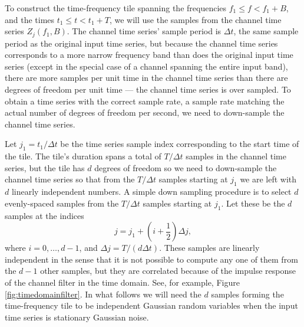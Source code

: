 \documentclass[10pt]{article}
\begin{document}
To construct the time-frequency tile spanning the frequencies \(f_{1} \leq
f < f_{1} + B\), and the times \(t_{1} \leq t < t_{1} + T\), we will use
the samples from the channel time series \(Z_{j}(f_{1}, B)\).  The channel
time series' sample period is \(\Delta t\), the same sample period as the
original input time series, but because the channel time series corresponds
to a more narrow frequency band than does the original input time series
(except in the special case of a channel spanning the entire input band),
there are more samples per unit time in the channel time series than there
are degrees of freedom per unit time --- the channel time series is over
sampled.  To obtain a time series with the correct sample rate, a sample
rate matching the actual number of degrees of freedom per second, we need
to down-sample the channel time series.

Let \(j_{1} = t_{1} / \Delta t\) be the time series sample index
corresponding to the start time of the tile.  The tile's duration spans a
total of \(T / \Delta t\) samples in the channel time series, but the tile
has \(d\) degrees of freedom so we need to down-sample the channel time
series so that from the \(T / \Delta t\) samples starting at \(j_{1}\) we
are left with \(d\) linearly independent numbers.  A simple down sampling
procedure is to select \(d\) evenly-spaced samples from the \(T / \Delta
t\) samples starting at \(j_{1}\).  Let these be the \(d\) samples at the
indices
\begin{equation}
\label{eqn8}
j
   = j_{1} + (i + \frac{1}{2}) \Delta j,
\end{equation}
where \(i = 0, \ldots, d - 1\), and \(\Delta j = T / (d \Delta t)\).  These
samples are linearly independent in the sense that it is not possible to
compute any one of them from the \(d - 1\) other samples, but they are
correlated because of the impulse response of the channel filter in the
time domain.  See, for example, Figure \ref{fig:timedomainfilter}.  In what
follows we will need the \(d\) samples forming the time-frequency tile to
be independent Gaussian random variables when the input time series is
stationary Gaussian noise.
\end{document}
